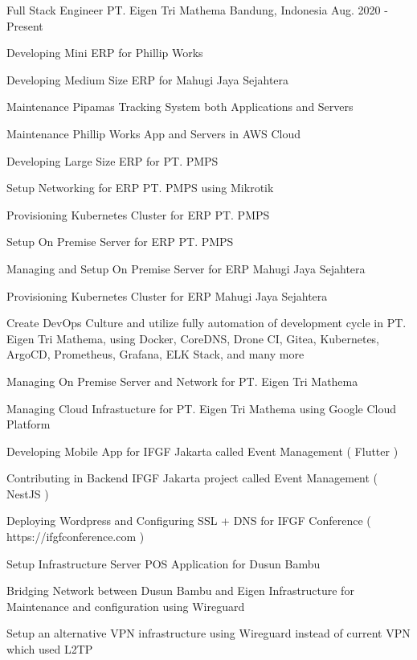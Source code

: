 \begin{cventries}
  \cventry
    {Full Stack Engineer} %
    {PT. Eigen Tri Mathema} %
    {Bandung, Indonesia} %
    {Aug. 2020 - Present} %
    {
      \begin{cvitems} %
        \item {Developing Mini ERP for Phillip Works}
        \item {Developing Medium Size ERP for Mahugi Jaya Sejahtera}
        \item {Maintenance Pipamas Tracking System both Applications and Servers}
        \item {Maintenance Phillip Works App and Servers in AWS Cloud}
        \item {Developing Large Size ERP for PT. PMPS}
        \item {Setup Networking for ERP PT. PMPS using Mikrotik}
        \item {Provisioning Kubernetes Cluster for ERP PT. PMPS}
        \item {Setup On Premise Server for ERP PT. PMPS}
        \item {Managing and Setup On Premise Server for ERP Mahugi Jaya Sejahtera}
        \item {Provisioning Kubernetes Cluster for ERP Mahugi Jaya Sejahtera}
        \item {Create DevOps Culture and utilize fully automation of development cycle in PT. Eigen Tri Mathema, using Docker, CoreDNS, Drone CI, Gitea, Kubernetes, ArgoCD, Prometheus, Grafana, ELK Stack, and many more}
        \item {Managing On Premise Server and Network for PT. Eigen Tri Mathema}
        \item {Managing Cloud Infrastucture for PT. Eigen Tri Mathema using Google Cloud Platform}
        \item {Developing Mobile App for IFGF Jakarta called Event Management ( Flutter )}
        \item {Contributing in Backend IFGF Jakarta project called Event Management ( NestJS )}
        \item {Deploying Wordpress and Configuring SSL + DNS for IFGF Conference ( https://ifgfconference.com )}
        \item {Setup Infrastructure Server POS Application for Dusun Bambu}
        \item {Bridging Network between Dusun Bambu and Eigen Infrastructure for Maintenance and configuration using Wireguard}
        \item {Setup an alternative VPN infrastructure using Wireguard instead of current VPN which used L2TP}
      \end{cvitems}
    }


\end{cventries}
